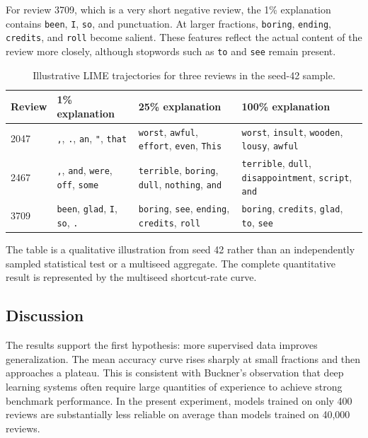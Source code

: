 \documentclass[11pt]{article}
\begin{document}
For review 3709, which is a very short negative review, the 1\% explanation contains \texttt{been}, \texttt{I}, \texttt{so}, and punctuation. At larger fractions, \texttt{boring}, \texttt{ending}, \texttt{credits}, and \texttt{roll} become salient. These features reflect the actual content of the review more closely, although stopwords such as \texttt{to} and \texttt{see} remain present.

\begin{table}[htbp]
\centering
\small
\caption{Illustrative LIME trajectories for three reviews in the seed-42 sample.}
\label{tab:qualitative}
\begin{tabular}{p{}p{}p{}p{}}
\toprule
Review & 1\% explanation & 25\% explanation & 100\% explanation \\
\midrule
2047 & \texttt{,}, \texttt{.}, \texttt{an}, \texttt{"}, \texttt{that} & \texttt{worst}, \texttt{awful}, \texttt{effort}, \texttt{even}, \texttt{This} & \texttt{worst}, \texttt{insult}, \texttt{wooden}, \texttt{lousy}, \texttt{awful} \\
2467 & \texttt{,}, \texttt{and}, \texttt{were}, \texttt{off}, \texttt{some} & \texttt{terrible}, \texttt{boring}, \texttt{dull}, \texttt{nothing}, \texttt{and} & \texttt{terrible}, \texttt{dull}, \texttt{disappointment}, \texttt{script}, \texttt{and} \\
3709 & \texttt{been}, \texttt{glad}, \texttt{I}, \texttt{so}, \texttt{.} & \texttt{boring}, \texttt{see}, \texttt{ending}, \texttt{credits}, \texttt{roll} & \texttt{boring}, \texttt{credits}, \texttt{glad}, \texttt{to}, \texttt{see} \\
\bottomrule
\end{tabular}
\end{table}

The table is a qualitative illustration from seed 42 rather than an independently sampled statistical test or a multiseed aggregate. The complete quantitative result is represented by the multiseed shortcut-rate curve.

\subsection{Discussion}

The results support the first hypothesis: more supervised data improves generalization. The mean accuracy curve rises sharply at small fractions and then approaches a plateau. This is consistent with Buckner's observation that deep learning systems often require large quantities of experience to achieve strong benchmark performance. In the present experiment, models trained on only 400 reviews are substantially less reliable on average than models trained on 40,000 reviews.
\end{document}
